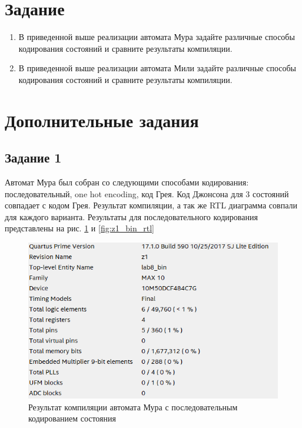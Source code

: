 \documentclass[a4paper,14pt]{article}
\begin{document}
	
	\tableofcontents
	\pagebreak
	\section{Задание}
	
	\begin{enumerate}
		\item В приведенной выше реализации автомата Мура задайте различные способы кодирования
		состояний и сравните результаты компиляции.
		
		\item В приведенной выше реализации автомата Мили задайте различные способы кодирования
		состояний и сравните результаты компиляции.
	\end{enumerate}
	
	\section{Дополнительные задания}
	
	\subsection{Задание 1}
	
	Автомат Мура был собран со следующими способами кодирования: последовательный, one hot encoding, код Грея.
	Код Джонсона для 3 состояний совпадает с кодом Грея.
	Результат компиляции, а так же RTL диаграмма совпали для каждого варианта.
	Результаты для последовательного кодирования представлены на рис. \ref{fig:z1_bin_report} и \ref{fig:z1_bin_rtl}
	
	\begin{figure}[H]
		\centering
		\includegraphics[width=0.8\linewidth]{images/z1_bin_report}
		\caption{Результат компиляции автомата Мура с последовательным кодированием состояния}
		\label{fig:z1_bin_report}
	\end{figure}	
	
\end{document}
